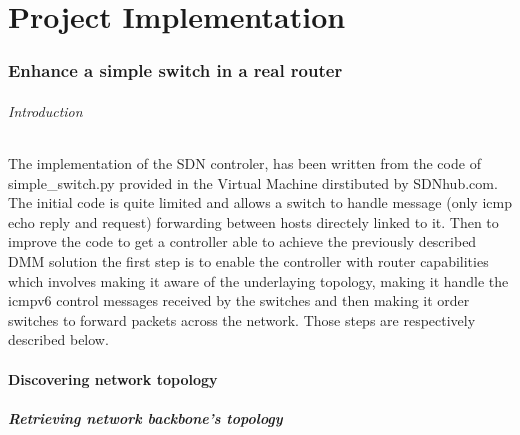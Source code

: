 \documentclass{article}
\begin{document}
\part{Project Implementation}

\section{Enhance a simple switch in a real router}

\paragraph{Introduction}
The implementation of the SDN controler, has been written from the
code of simple\_switch.py provided in the Virtual Machine dirstibuted
by SDNhub.com. The initial code is quite limited and allows a switch
to handle message (only icmp echo reply and request) forwarding between
hosts directely linked to it. Then to improve the code to get a
controller able to achieve the previously described DMM solution the
first step is to enable the controller with router capabilities which
involves making it aware of the underlaying topology, making it handle
the icmpv6 control messages received by the switches and then making
it order switches to forward packets across the network. Those steps
are respectively described below.

\subsection{Discovering network topology}

\subsubsection{Retrieving network backbone's topology}
\end{document}
